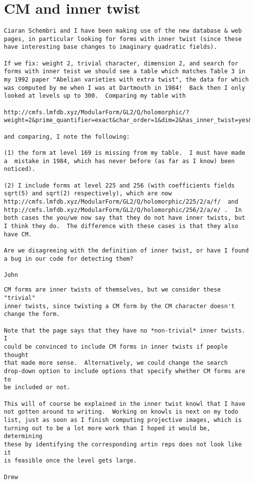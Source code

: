 \documentclass[11pt]{amsart}
\numberwithin{equation}{subsection}
\theoremstyle{definition}
\begin{document}
\section{CM and inner twist}

\begin{verbatim}
Ciaran Schembri and I have been making use of the new database & web pages, in particular looking for forms with inner twist (since these have interesting base changes to imaginary quadratic fields).

If we fix: weight 2, trivial character, dimension 2, and search for forms with inner teist we should see a table which matches Table 3 in my 1992 paper "Abelian varieties with extra twist", the data for which was computed by me when I was at Dartmouth in 1984!  Back then I only looked at levels up to 300.  Comparing my table with 

http://cmfs.lmfdb.xyz/ModularForm/GL2/Q/holomorphic/?weight=2&prime_quantifier=exact&char_order=1&dim=2&has_inner_twist=yes&count=50&submit=

and comparing, I note the following:

(1) the form at level 169 is missing from my table.  I must have made a  mistake in 1984, which has never before (as far as I know) been noticed).

(2) I include forms at level 225 and 256 (with coefficients fields sqrt(5) and sqrt(2) respectively), which are now   http://cmfs.lmfdb.xyz/ModularForm/GL2/Q/holomorphic/225/2/a/f/  and http://cmfs.lmfdb.xyz/ModularForm/GL2/Q/holomorphic/256/2/a/e/ .  In both cases the you/we now say that they do not have inner twists, but I think they do.  The difference with these cases is that they also have CM.

Are we disagreeing with the definition of inner twist, or have I found a bug in our code for detecting them?

John
\end{verbatim}

\begin{verbatim}
CM forms are inner twists of themselves, but we consider these "trivial" 
inner twists, since twisting a CM form by the CM character doesn't 
change the form.

Note that the page says that they have no *non-trivial* inner twists.  I 
could be convinced to include CM forms in inner twists if people thought 
that made more sense.  Alternatively, we could change the search 
drop-down option to include options that specify whether CM forms are to 
be included or not.

This will of course be explained in the inner twist knowl that I have 
not gotten around to writing.  Working on knowls is next on my todo 
list, just as soon as I finish computing projective images, which is 
turning out to be a lot more work than I hoped it would be, determining 
these by identifying the corresponding artin reps does not look like it 
is feasible once the level gets large.

Drew
\end{verbatim}
\end{document}

